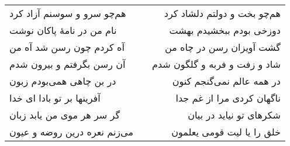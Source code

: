 \begin{center}
\begin{longtable}{l p{0.5cm} r}
هم‌چو سرو و سوسنم آزاد کرد
&&
هم‌چو بخت و دولتم دلشاد کرد
\\
نام من در نامهٔ پاکان نوشت
&&
دوزخی بودم ببخشیدم بهشت
\\
آه کردم چون رسن شد آه من
&&
گشت آویزان رسن در چاه من
\\
آن رسن بگرفتم و بیرون شدم
&&
شاد و زفت و فربه و گلگون شدم
\\
در بن چاهی همی‌بودم زبون
&&
در همه عالم نمی‌گنجم کنون
\\
آفرینها بر تو بادا ای خدا
&&
ناگهان کردی مرا از غم جدا
\\
گر سر هر موی من یابد زبان
&&
شکرهای تو نیاید در بیان
\\
می‌زنم نعره درین روضه و عیون
&&
خلق را یا لیت قومی یعلمون
\\
\end{longtable}
\end{center}
